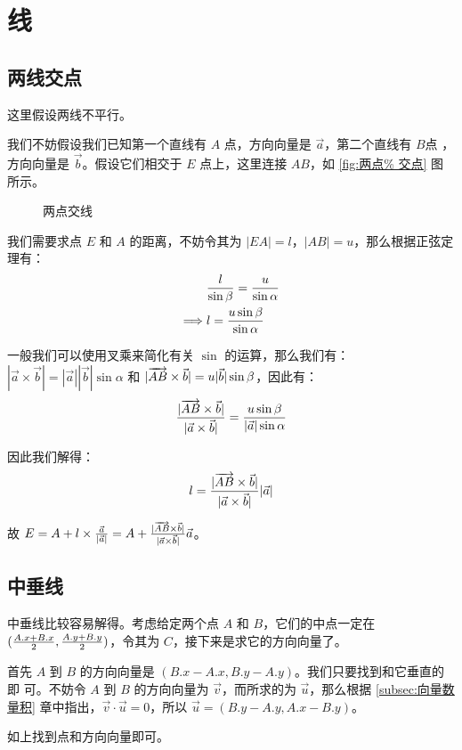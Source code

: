 \section{线}
\subsection{两线交点} \label{subsec:两点交点}
这里假设两线不平行。

我们不妨假设我们已知第一个直线有 $A$ 点，方向向量是 $\vec a$，第二个直线有 $B$点
，方向向量是 $\vec b$。假设它们相交于 $E$ 点上，这里连接 $AB$，如 \ref{fig:两点%
交点} 图所示。

\begin{figure}
\centering
{}
\caption{两点交线}
\label{fig:两点交点}
\end{figure}

我们需要求点 $E$ 和 $A$ 的距离，不妨令其为 $|EA| = l$，$|AB| = u$，那么根据正弦定理有：
$$
\begin{aligned}
                    {} & {l \over \sin \beta} = {u \over \sin \alpha} \\
    \Longrightarrow {} & l = {u \sin \beta \over \sin \alpha}
\end{aligned}
$$

一般我们可以使用叉乘来简化有关 $\sin$ 的运算，那么我们有：$|\vec a \times \vec
b| = |\vec a||\vec b|\sin \alpha$ 和 $|\overrightarrow{AB} \times \vec b| = u |\vec b| \sin
\beta$，因此有：$$ {|\overrightarrow{AB} \times \vec b| \over |\vec a \times \vec b|} = {u
\sin \beta \over |\vec a| \sin \alpha} $$

因此我们解得：$$ l = {|\overrightarrow{AB} \times \vec b| \over |\vec a \times \vec b|}
|\vec a| $$

故 $E = A + l \times {\vec a \over |\vec a|} = A + {|\overrightarrow{AB} \times \vec b|
\over |\vec a \times \vec b|} \vec a$。

\subsection{中垂线} \label{subsec:中垂线}
中垂线比较容易解得。考虑给定两个点 $A$ 和 $B$，它们的中点一定在 $({A.x + B.x
\over 2}, {A.y + B.y \over 2})$，令其为 $C$，接下来是求它的方向向量了。

首先 $A$ 到 $B$ 的方向向量是 $(B.x - A.x, B.y - A.y)$。我们只要找到和它垂直的即
可。不妨令 $A$ 到 $B$ 的方向向量为 $\vec v$，而所求的为 $\vec u$，那么根据
\ref{subsec:向量数量积} 章中指出，$\vec v \cdot \vec u = 0$，所以 $\vec u = (B.y
- A.y, A.x - B.y)$。

如上找到点和方向向量即可。


